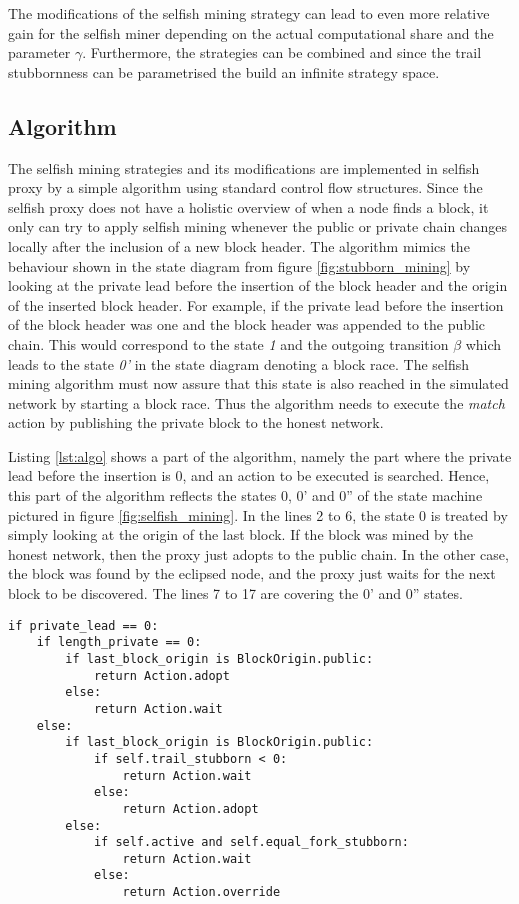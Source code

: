 The modifications of the selfish mining strategy can lead to even more relative gain for the selfish miner depending on the actual computational share and the parameter $\gamma$.
Furthermore, the strategies can be combined and since the trail stubbornness can be parametrised the build an infinite strategy space.

\subsection{Algorithm}

The selfish mining strategies and its modifications are implemented in selfish proxy by a simple algorithm using standard control flow structures.
Since the selfish proxy does not have a holistic overview of when a node finds a block, it only can try to apply selfish mining whenever the public or private chain changes locally after the inclusion of a new block header.
The algorithm mimics the behaviour shown in the state diagram from figure \ref{fig:stubborn_mining} by looking at the private lead before the insertion of the block header and the origin of the inserted block header.
For example, if the private lead before the insertion of the block header was one and the block header was appended to the public chain.
This would correspond to the state \textit{1} and the outgoing transition $\beta$ which leads to the state \textit{0'} in the state diagram denoting a block race.
The selfish mining algorithm must now assure that this state is also reached in the simulated network by starting a block race.
Thus the algorithm needs to execute the \textit{match} action by publishing the private block to the honest network.

Listing \ref{lst:algo} shows a part of the algorithm, namely the part where the private lead before the insertion is 0, and an action to be executed is searched.
Hence, this part of the algorithm reflects the states 0, 0' and 0'' of the state machine pictured in figure \ref{fig:selfish_mining}.
In the lines 2 to 6, the state 0 is treated by simply looking at the origin of the last block.
If the block was mined by the honest network, then the proxy just adopts to the public chain.
In the other case, the block was found by the eclipsed node, and the proxy just waits for the next block to be discovered.
The lines 7 to 17 are covering the 0' and 0'' states.

\begin{minipage}{\linewidth}
\begin{lstlisting}[caption=Part of the selfish mining algorithm where private lead is zero, label={lst:algo}, basicstyle=\ttfamily, captionpos=b]
if private_lead == 0:
    if length_private == 0:
        if last_block_origin is BlockOrigin.public:
            return Action.adopt
        else:
            return Action.wait
    else:
        if last_block_origin is BlockOrigin.public:
            if self.trail_stubborn < 0:
                return Action.wait
            else:
                return Action.adopt
        else:
            if self.active and self.equal_fork_stubborn:
                return Action.wait
            else:
                return Action.override
\end{lstlisting}
\end{minipage}

